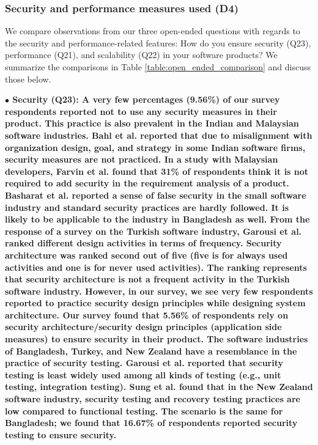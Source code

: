 \subsubsection{Security and performance measures used (D4)}\label{sec:rq2-d4}
We compare observations from our three open-ended questions with regards to the security and performance-related features:
How do you ensure security (Q23), performance (Q21), and scalability (Q22) in your software products? We summarize the 
comparisons in Table \ref{table:open_ended_comparison} and discuss those below.


\nd\bf{$\bullet$ Security (Q23):} A very few percentages (9.56\%) of our survey
respondents reported not to use any security measures in their product. This
practice is also prevalent in the Indian and Malaysian software industries. Bahl
et al.\citep{Bahl2011} reported that due to misalignment with organization
design, goal, and strategy in some Indian software firms, security measures are
not practiced. In a study with Malaysian developers, Farvin et
al.\citep{Farvin2016} found that 31\% of respondents think it is not required to
add security in the requirement analysis of a product. Basharat et
al.\citep{Basharat2013} reported a sense of false security in the small software
industry and standard security practices are hardly followed. It is likely to be
applicable to the industry in Bangladesh as well. From the response of a survey
on the Turkish software industry, Garousi et al.\citep{Garousi2015} ranked
different design activities in terms of frequency. Security architecture was
ranked second out of five (five is for always used activities and one is for
never used activities). The ranking represents that security architecture is not
a frequent activity in the Turkish software industry. However, in our survey, we
see very few respondents reported to practice security design principles while
designing system architecture. Our survey found that 5.56\% of respondents rely
on security architecture/security design principles (application side measures)
to ensure security in their product. The software industries of Bangladesh,
Turkey, and New Zealand have a resemblance in the practice of security testing.
Garousi et al.\citep{Garousi2015} reported that security testing is least widely
used among all kinds of testing (e.g., unit testing, integration testing). Sung
et al.\citep{Sung2006} found that in the New Zealand software industry, security
testing and recovery testing practices are low compared to functional testing.
The scenario is the same for Bangladesh; we found that 16.67\% of respondents
reported security testing to ensure security.


